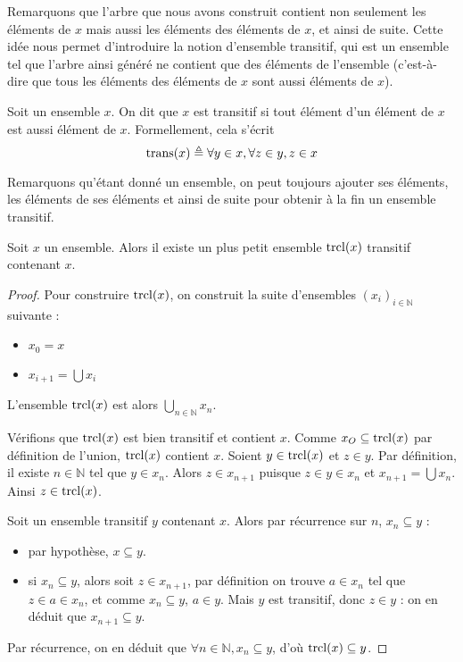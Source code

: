 Remarquons que l'arbre que nous avons construit contient non seulement les
éléments de $x$ mais aussi les éléments des éléments de $x$, et ainsi de suite.
Cette idée nous permet d'introduire la notion d'ensemble transitif, qui est un
ensemble tel que l'arbre ainsi généré ne contient que des éléments de l'ensemble
(c'est-à-dire que tous les éléments des éléments de $x$ sont aussi éléments de
$x$).

\begin{definition}
  Soit un ensemble $x$. On dit que $x$ est transitif si tout élément d'un élément
  de $x$ est aussi élément de $x$. Formellement, cela s'écrit
  \[\operatorname{trans}(x) \triangleq \forall y\in x, \forall z \in y, z\in x\]
\end{definition}

Remarquons qu'étant donné un ensemble, on peut toujours ajouter ses éléments, les
éléments de ses éléments et ainsi de suite pour obtenir à la fin un ensemble
transitif.

\begin{proposition}
  Soit $x$ un ensemble. Alors il existe un plus petit ensemble $\operatorname{trcl}(x)$
  transitif contenant $x$.
\end{proposition}

\begin{proof}
  Pour construire $\operatorname{trcl}(x)$, on construit la suite d'ensembles
  $(x_i)_{i\in\mathbb N}$ suivante :
  \begin{itemize}
  \item $x_0 = x$
  \item $x_{i+1} = \bigcup x_i$
  \end{itemize}
  L'ensemble $\operatorname{trcl}(x)$ est alors $\displaystyle\bigcup_{n\in \mathbb N} x_n$.

  Vérifions que $\operatorname{trcl}(x)$ est bien transitif et contient $x$. Comme
  $x_O\subseteq \operatorname{trcl}(x)$ par définition de l'union, $\operatorname{trcl}(x)$ contient $x$.
  Soient $y\in \operatorname{trcl}(x)$ et $z\in y$. Par définition, il existe $n\in \mathbb N$
  tel que $y\in x_n$. Alors $z\in x_{n+1}$ puisque $z\in y \in x_n$ et
  $x_{n+1}=\bigcup x_n$. Ainsi $z\in \operatorname{trcl}(x)$.

  Soit un ensemble transitif $y$ contenant $x$. Alors par récurrence sur $n$,
  $x_n\subseteq y$ :
  \begin{itemize}
  \item par hypothèse, $x\subseteq y$.
  \item si $x_n\subseteq y$, alors soit $z\in x_{n+1}$, par définition on trouve
    $a\in x_n$ tel que $z\in a \in x_n$, et comme $x_n\subseteq y$, $a\in y$.
    Mais $y$ est transitif, donc $z\in y$ : on en déduit que $x_{n+1}\subseteq y$.
  \end{itemize}
  Par récurrence, on en déduit que $\forall n\in\mathbb N, x_n\subseteq y$,
  d'où $\operatorname{trcl}(x)\subseteq y$.
\end{proof}

